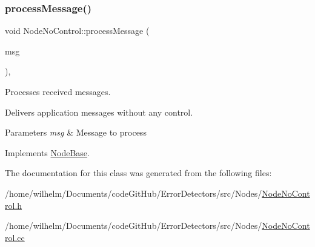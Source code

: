 \subsubsection{\texorpdfstring{process\+Message()}{processMessage()}}
{\footnotesize\ttfamily void Node\+No\+Control\+::process\+Message (\begin{DoxyParamCaption}\item[{c\+Message $\ast$}]{msg }\end{DoxyParamCaption})\hspace{0.3cm}{\ttfamily [private]}, {\ttfamily [virtual]}}



Processes received messages. 

Delivers application messages without any control. 
\begin{DoxyParams}{Parameters}
{\em msg} & Message to process \\
\hline
\end{DoxyParams}


Implements \hyperlink{class_node_base_ae70b168f2bc7407c249594b1c614301c}{Node\+Base}.



The documentation for this class was generated from the following files\+:\begin{DoxyCompactItemize}
\item 
/home/wilhelm/\+Documents/code\+Git\+Hub/\+Error\+Detectors/src/\+Nodes/\hyperlink{_node_no_control_8h}{Node\+No\+Control.\+h}\item 
/home/wilhelm/\+Documents/code\+Git\+Hub/\+Error\+Detectors/src/\+Nodes/\hyperlink{_node_no_control_8cc}{Node\+No\+Control.\+cc}\end{DoxyCompactItemize}
